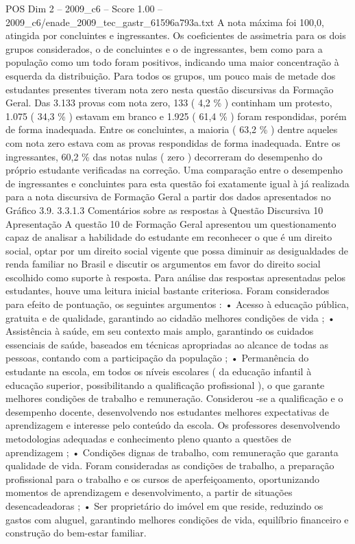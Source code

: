 \begin{textsample}{POS Dim 2 – 2009\_c6 – Score 1.00 – 2009\_c6/enade\_2009\_tec\_gastr\_61596a793a.txt}
A nota máxima foi 100,0, atingida por concluintes e ingressantes.
Os coeficientes de assimetria para os dois grupos considerados, o de concluintes e o de ingressantes, bem como para a população como um todo foram positivos, indicando uma maior concentração à esquerda da distribuição.
Para todos os grupos, um pouco mais de metade dos estudantes presentes tiveram nota zero nesta questão discursivas da Formação Geral.
Das 3.133 provas com nota zero, 133 ( 4,2 \% ) continham um protesto, 1.075 ( 34,3 \% ) estavam em branco e 1.925 ( 61,4 \% ) foram respondidas, porém de forma inadequada.
Entre os concluintes, a maioria ( 63,2 \% ) dentre aqueles com nota zero estava com as provas respondidas de forma inadequada.
Entre os ingressantes, 60,2 \% das notas nulas ( zero ) decorreram do desempenho do próprio estudante verificadas na correção.
Uma comparação entre o desempenho de ingressantes e concluintes para esta questão foi exatamente igual à já realizada para a nota discursiva de Formação Geral a partir dos dados apresentados no Gráfico 3.9. 3.3.1.3 Comentários sobre as respostas à Questão Discursiva 10 Apresentação A questão 10 de Formação Geral apresentou um questionamento capaz de analisar a habilidade do estudante em reconhecer o que é um direito social, optar por um direito social vigente que possa diminuir as desigualdades de renda familiar no Brasil e discutir os argumentos em favor do direito social escolhido como suporte à resposta.
Para análise das respostas apresentadas pelos estudantes, houve uma leitura inicial bastante criteriosa.
Foram considerados para efeito de pontuação, os seguintes argumentos : • Acesso à educação pública, gratuita e de qualidade, garantindo ao cidadão melhores condições de vida ; • Assistência à saúde, em seu contexto mais amplo, garantindo os cuidados essenciais de saúde, baseados em técnicas apropriadas ao alcance de todas as pessoas, contando com a participação da população ; • Permanência do estudante na escola, em todos os níveis escolares ( da educação infantil à educação superior, possibilitando a qualificação profissional ), o que garante melhores condições de trabalho e remuneração.
Considerou -se a qualificação e o desempenho docente, desenvolvendo nos estudantes melhores expectativas de aprendizagem e interesse pelo conteúdo da escola.
Os professores desenvolvendo metodologias adequadas e conhecimento pleno quanto a questões de aprendizagem ; • Condições dignas de trabalho, com remuneração que garanta qualidade de vida.
Foram consideradas as condições de trabalho, a preparação profissional para o trabalho e os cursos de aperfeiçoamento, oportunizando momentos de aprendizagem e desenvolvimento, a partir de situações desencadeadoras ; • Ser proprietário do imóvel em que reside, reduzindo os gastos com aluguel, garantindo melhores condições de vida, equilíbrio financeiro e construção do bem-estar familiar.

\end{textsample}
